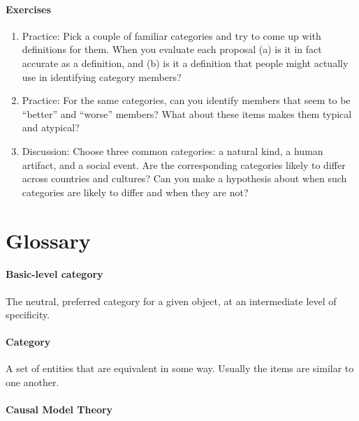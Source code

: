 \documentclass[
]{krantz}
\providecommand{\tightlist}{%
  \setlength{\itemsep}{0pt}\setlength{\parskip}{0pt}}
\begin{document}
\paragraph*{Exercises}\label{exercises-6}

\begin{enumerate}
\def\labelenumi{\arabic{enumi}.}
\tightlist
\item
  Practice: Pick a couple of familiar categories and try to come up with definitions for them. When you evaluate each proposal (a) is it in fact accurate as a definition, and (b) is it a definition that people might actually use in identifying category members?
\item
  Practice: For the same categories, can you identify members that seem to be ``better'' and ``worse'' members? What about these items makes them typical and atypical?
\item
  Discussion: Choose three common categories: a natural kind, a human artifact, and a social event. Are the corresponding categories likely to differ across countries and cultures? Can you make a hypothesis about when such categories are likely to differ and when they are not?
\end{enumerate}

\section{Glossary}\label{glossary-6}

\paragraph*{Basic-level category}\label{basic-level-category}

The neutral, preferred category for a given object, at an intermediate level of specificity.

\paragraph*{Category}\label{category}

A set of entities that are equivalent in some way. Usually the items are similar to one another.

\paragraph*{Causal Model Theory}\label{causal-model-theory}
\end{document}
